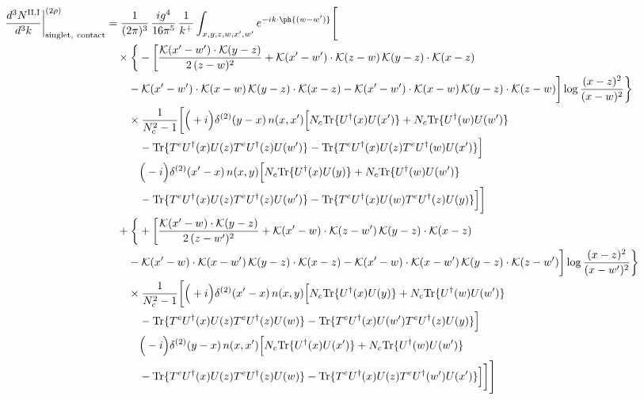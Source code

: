 \begin{align}
\frac{d^{3}N^{\rm II.I}}{d^{3}k}\bigg|^{(2\rho)}_{\rm singlet,\ contact}&=\frac{1}{(2\pi)^{3}}\,\frac{ig^{4}}{16\pi^{5}}\,\frac{1}{k^{+}}\int_{x,y,z,w,x',w'}e^{-ik\cdot\ph{(w-w')}}\Bigg[\notag\\
&\quad\times\bigg\{-\bigg[\frac{\mathcal{K}(x'-w')\cdot\mathcal{K}(y-z)}{2\,(z-w)^{2}}+\mathcal{K}(x'-w')\cdot\mathcal{K}(z-w)\,\mathcal{K}(y-z)\cdot\mathcal{K}(x-z)\notag\\
&\qquad-\mathcal{K}(x'-w')\cdot\mathcal{K}(x-w)\,\mathcal{K}(y-z)\cdot\mathcal{K}(x-z)-\mathcal{K}(x'-w')\cdot\mathcal{K}(x-w)\,\mathcal{K}(y-z)\cdot\mathcal{K}(z-w)\bigg]\log\frac{(x-z)^{2}}{(x-w)^{2}}\bigg\}\notag\\
&\qquad\times \frac{1}{N_{c}^{2}-1}\bigg[\Big(+i\Big)\delta^{(2)}(y-x)\,n(x,x')\Big[N_{c}{\rm Tr}\{U^{\dagger}(x)U(x')\}+N_{c}{\rm Tr}\{U^{\dagger}(w)U(w')\}\notag\\
&\qquad\quad -{\rm Tr}\{T^{e}U^{\dagger}(x)U(z)T^{e}U^{\dagger}(z)U(w')\}-{\rm Tr}\{T^{e}U^{\dagger}(x)U(z)T^{e}U^{\dagger}(w)U(x')\}\Big]\notag\\
&\qquad\quad \Big(-i\Big)\delta^{(2)}(x'-x)\,n(x,y)\Big[N_{c}{\rm Tr}\{U^{\dagger}(x)U(y)\}+N_{c}{\rm Tr}\{U^{\dagger}(w)U(w')\}\notag\\
&\qquad\quad -{\rm Tr}\{T^{e}U^{\dagger}(x)U(z)T^{e}U^{\dagger}(z)U(w')\}-{\rm Tr}\{T^{e}U^{\dagger}(x)U(w)T^{e}U^{\dagger}(z)U(y)\}\Big]\bigg]\notag\\
&\quad+\bigg\{+\bigg[\frac{\mathcal{K}(x'-w)\cdot\mathcal{K}(y-z)}{2\,(z-w')^{2}}+\mathcal{K}(x'-w)\cdot\mathcal{K}(z-w')\,\mathcal{K}(y-z)\cdot\mathcal{K}(x-z)\notag\\
&\qquad-\mathcal{K}(x'-w)\cdot\mathcal{K}(x-w')\,\mathcal{K}(y-z)\cdot\mathcal{K}(x-z)-\mathcal{K}(x'-w)\cdot\mathcal{K}(x-w')\,\mathcal{K}(y-z)\cdot\mathcal{K}(z-w')\bigg]\log\frac{(x-z)^{2}}{(x-w')^{2}}\bigg\}\notag\\
&\qquad\times \frac{1}{N_{c}^{2}-1}\bigg[\Big(+i\Big)\delta^{(2)}(x'-x)\,n(x,y)\Big[N_{c}{\rm Tr}\{U^{\dagger}(x)U(y)\}+N_{c}{\rm Tr}\{U^{\dagger}(w)U(w')\}\notag\\
&\qquad\quad -{\rm Tr}\{T^{e}U^{\dagger}(x)U(z)T^{e}U^{\dagger}(z)U(w)\}-{\rm Tr}\{T^{e}U^{\dagger}(x)U(w')T^{e}U^{\dagger}(z)U(y)\}\Big]\notag\\
&\qquad\quad \Big(-i\Big)\delta^{(2)}(y-x)\,n(x,x')\Big[N_{c}{\rm Tr}\{U^{\dagger}(x)U(x')\}+N_{c}{\rm Tr}\{U^{\dagger}(w)U(w')\}\notag\\
&\qquad\quad -{\rm Tr}\{T^{e}U^{\dagger}(x)U(z)T^{e}U^{\dagger}(z)U(w)\}-{\rm Tr}\{T^{e}U^{\dagger}(x)U(z)T^{e}U^{\dagger}(w')U(x')\}\Big]\bigg]\Bigg]\label{eq:E-II.I-2}
\end{align}
